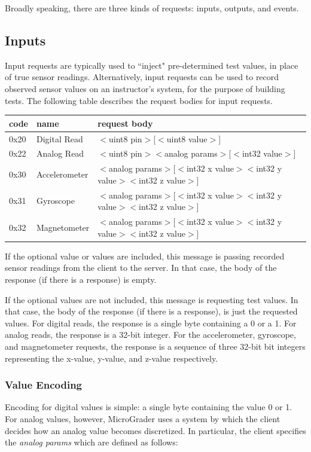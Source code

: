 \documentclass[12pt]{article}
\begin{document}
Broadly speaking, there are three kinds of requests: inputs, outputs, and events.

\subsection{Inputs}
Input requests are typically used to ``inject" pre-determined test values, in place of true sensor readings.  Alternatively, input requests can be used to record observed sensor values on an instructor's system, for the purpose of building tests.  The following table describes the request bodies for input requests.

\begin{center}
\begin{tabular}{l l l}
code & name & request body \\ \hline
0x20 & Digital Read & $<$uint8 pin$>$[$<$uint8 value$>$] \\
0x22 & Analog Read & $<$uint8 pin$>$$<$analog params$>$[$<$int32 value$>$] \\
0x30 & Accelerometer & $<$analog params$>$[$<$int32 x value$>$$<$int32 y value$>$$<$int32 z value$>$] \\
0x31 & Gyroscope & $<$analog params$>$[$<$int32 x value$>$$<$int32 y value$>$$<$int32 z value$>$] \\
0x32 & Magnetometer & $<$analog params$>$[$<$int32 x value$>$$<$int32 y value$>$$<$int32 z value$>$] \\ \hline
\end{tabular}
\end{center}

\vspace{5mm}

If the optional value or values are included, this message is passing recorded sensor readings from the client to the server.  In that case, the body of the response (if there is a response) is empty.  

If the optional values are not included, this message is requesting test values.  In that case, the body of the response (if there is a response), is just the requested values.  For digital reads, the response is a single byte containing a 0 or a 1.  For analog reads, the response is a 32-bit integer.  For the accelerometer, gyroscope, and magnetometer requests, the response is a sequence of three 32-bit bit integers representing the x-value, y-value, and z-value respectively.

\subsubsection{Value Encoding}
Encoding for digital values is simple: a single byte containing the value 0 or 1.  For analog values, however, MicroGrader uses a system by which the client decides how an analog value becomes discretized.  In particular, the client specifies the \textit{analog params} which are defined as follows:
\end{document}
